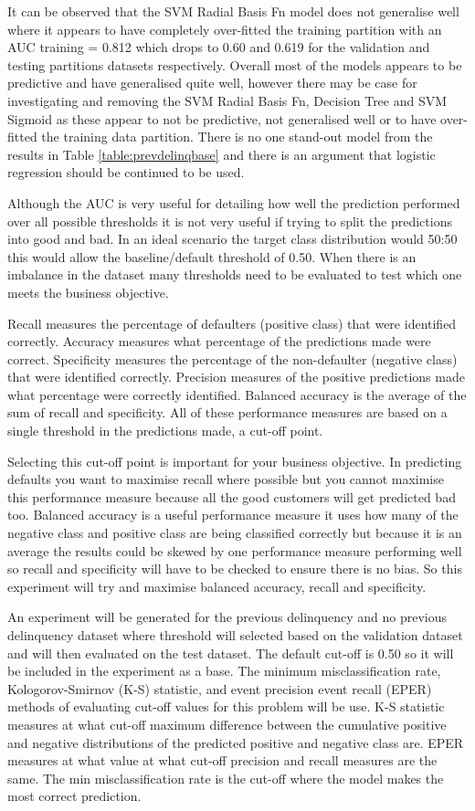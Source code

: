 It can be observed that the SVM Radial Basis Fn model does not generalise well where it appears to have completely over-fitted the training partition with an AUC training = 0.812 which drops to 0.60 and 0.619 for the validation and testing partitions datasets respectively. Overall most of the models appears to be predictive and have generalised quite well, however there may be case for investigating and removing the SVM Radial Basis Fn, Decision Tree and SVM Sigmoid as these appear to not be predictive, not generalised well or to have over-fitted the training data partition. There is no one stand-out model from the results in Table \ref{table:prevdelinqbase} and there is an argument that logistic regression should be continued to be used. 


Although the AUC is very useful for detailing how well the prediction performed over all possible thresholds it is not very useful if trying to split the predictions into good and bad. In an ideal scenario the target class distribution would 50:50 this would allow the baseline/default threshold of 0.50. When there is an imbalance in the dataset many thresholds need to be evaluated to test which one meets the business objective.

Recall measures the percentage of defaulters (positive class) that were identified correctly. Accuracy measures what percentage of the predictions made were correct. Specificity measures the percentage of the non-defaulter (negative class) that were identified correctly. Precision measures of the positive predictions made what percentage were correctly identified. Balanced accuracy is the average of the sum of recall and specificity. All of these performance measures are based on a single threshold in the predictions made, a cut-off point.

Selecting this cut-off point is important for your business objective. In predicting defaults you want to maximise recall where possible but you cannot maximise this performance measure because all the good customers will get predicted bad too. Balanced accuracy is a useful performance measure it uses how many of the negative class and positive class are being classified correctly but because it is an average the results could be skewed by one performance measure performing well so recall and specificity will have to be checked to ensure there is no bias. So this experiment will try and maximise balanced accuracy, recall and specificity.

An experiment will be generated for the previous delinquency and no previous delinquency dataset where threshold will selected based on the validation dataset and will then evaluated on the test dataset. The default cut-off is 0.50 so it will be included in the experiment as a base. The minimum misclassification rate, Kologorov-Smirnov (K-S) statistic, and event precision event recall (EPER) methods of evaluating cut-off values for this problem will be use.
K-S statistic measures at what cut-off maximum difference between the cumulative positive and negative distributions of the predicted positive and negative class are. EPER measures at what value at what cut-off precision and recall measures are the same. The min misclassification rate is the cut-off where the model makes the most correct prediction. 


